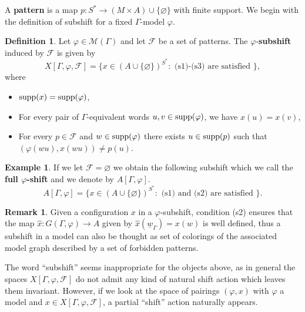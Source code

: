 \documentclass{article}
\theoremstyle{definition}
\newtheorem{remark}[theorem]{Remark}
\newtheorem{defn}[theorem]{Definition} %
\newtheorem{example}[theorem]{Example} %
\theoremstyle{definition}
\newcommand{\M}{\mathcal{M}}
\newcommand{\supp}{\textnormal{supp}}
\newcommand{\define}[1]{\textbf{#1}}
\begin{document}
A \define{pattern} is a map $p \colon S^* \to (M \times A) \cup \{\varnothing\}$ with finite support. We begin with the definition of subshift for a fixed $\Gamma$-model $\varphi$. %
\begin{defn}
\label{def:phi_subshift}
    Let $\varphi \in \M(\Gamma)$ and let $\mathcal{F}$ be a set of patterns. The $\varphi$-\define{subshift} induced by $\mathcal{F}$  is given by \[ X[\Gamma,\varphi,{\mathcal{F}}] = \{ x \in (A\cup \{\varnothing\}  )^{S^*} : \mbox{ (s1)-(s3) are satisfied }   \},    \]
    where \begin{itemize}
        \item[(s1)] $\supp(x) = \supp(\varphi)$,
        \item[(s2)] For every pair of $\Gamma$-equivalent words $u,v \in \supp(\varphi)$, we have $x(u)=x(v)$,
        \item[(s3)] For every $p \in \mathcal{F}$ and $w \in \supp(\varphi)$ there exists $u \in \supp(p)$ such that $(\varphi(wu),x(wu)) \neq p(u)$.
    \end{itemize}
\end{defn}

\begin{example}
    If we let $\mathcal{F}=\varnothing$ we obtain the following subshift which we call the \define{full $\varphi$-shift} and we denote by $A[\Gamma,\varphi]$. \[ A[\Gamma,\varphi] = \{x \in  (A\cup \{\varnothing\}  )^{S^*} :  \mbox{ (s1) and (s2) are satisfied } \}.   \]
\end{example}

\begin{remark}
    Given a configuration $x$ in a $\varphi$-subshift, condition (s2) ensures that the map $\widehat{x}\colon G(\Gamma,\varphi)\to A$ given by $\widehat{x}(\underline{w}_{\Gamma}) = x(w)$ is well defined, thus a subshift in a model can also be thought as set of colorings of the associated model graph described by a set of forbidden patterns. 
\end{remark}

The word ``subshift'' seems inappropriate for the objects above, as in general the spaces $X[\Gamma,\varphi,\mathcal{F}]$ do not admit any kind of natural shift action which leaves them invariant. However, if we look at the space of pairings $(\varphi,x)$ with $\varphi$ a model and $x \in X[\Gamma,\varphi,\mathcal{F}]$, a partial ``shift'' action naturally appears.
\end{document}
